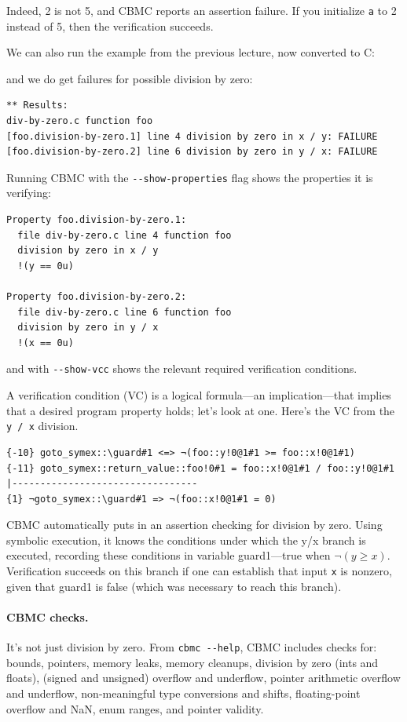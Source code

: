 \documentclass[11pt]{article}
\begin{document}
Indeed, 2 is not 5, and CBMC reports an assertion failure. If you initialize \texttt{a} to 2 instead of 5,
then the verification succeeds.

We can also run the example from the previous lecture, now converted to C:



\noindent
and we do get failures for possible division by zero:

{\scriptsize
\begin{verbatim}
** Results:
div-by-zero.c function foo
[foo.division-by-zero.1] line 4 division by zero in x / y: FAILURE
[foo.division-by-zero.2] line 6 division by zero in y / x: FAILURE
\end{verbatim} }

Running CBMC with the \verb+--show-properties+ flag shows the properties it is verifying:
{\scriptsize
\begin{verbatim}
Property foo.division-by-zero.1:
  file div-by-zero.c line 4 function foo
  division by zero in x / y
  !(y == 0u)

Property foo.division-by-zero.2:
  file div-by-zero.c line 6 function foo
  division by zero in y / x
  !(x == 0u)
\end{verbatim}}
and with \verb+--show-vcc+ shows the relevant required verification conditions.

A verification condition (VC) is a logical formula---an implication---that implies that
a desired program property holds; let's look at one.
Here's the VC from the \texttt{y / x} division.
{\scriptsize \begin{verbatim}
{-10} goto_symex::\guard#1 <=> ¬(foo::y!0@1#1 >= foo::x!0@1#1)
{-11} goto_symex::return_value::foo!0#1 = foo::x!0@1#1 / foo::y!0@1#1
|---------------------------------
{1} ¬goto_symex::\guard#1 => ¬(foo::x!0@1#1 = 0)
\end{verbatim} }

  CBMC automatically puts in an assertion checking for division by zero.
  Using symbolic execution, it knows
  the conditions under which the y/x branch is executed, recording these conditions in variable guard1---true when $\neg (y \ge x)$.
  Verification succeeds on this branch if one can establish that input \texttt{x} is nonzero, given that guard1 is false (which was necessary to reach this branch).

\paragraph{CBMC checks.}
It's not just division by zero. From \verb+cbmc --help+, CBMC includes checks for: bounds, pointers, memory leaks,
memory cleanups, division by zero (ints and floats), (signed and unsigned) overflow and underflow, pointer
arithmetic overflow and underflow, non-meaningful type conversions and shifts, floating-point overflow and NaN,
enum ranges, and pointer validity.
\end{document}
